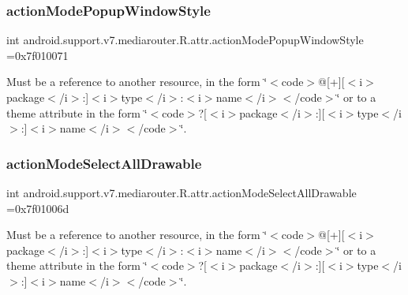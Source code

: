 \subsubsection{\texorpdfstring{action\+Mode\+Popup\+Window\+Style}{actionModePopupWindowStyle}}
{\footnotesize\ttfamily int android.\+support.\+v7.\+mediarouter.\+R.\+attr.\+action\+Mode\+Popup\+Window\+Style =0x7f010071\hspace{0.3cm}{\ttfamily [static]}}

Must be a reference to another resource, in the form \char`\"{}$<$code$>$@\mbox{[}+\mbox{]}\mbox{[}$<$i$>$package$<$/i$>$\+:\mbox{]}$<$i$>$type$<$/i$>$\+:$<$i$>$name$<$/i$>$$<$/code$>$\char`\"{} or to a theme attribute in the form \char`\"{}$<$code$>$?\mbox{[}$<$i$>$package$<$/i$>$\+:\mbox{]}\mbox{[}$<$i$>$type$<$/i$>$\+:\mbox{]}$<$i$>$name$<$/i$>$$<$/code$>$\char`\"{}. \mbox{\label{classandroid_1_1support_1_1v7_1_1mediarouter_1_1R_1_1attr_a06a8af9b5fdcb81fe91facc4e5cf9781}} 
\subsubsection{\texorpdfstring{action\+Mode\+Select\+All\+Drawable}{actionModeSelectAllDrawable}}
{\footnotesize\ttfamily int android.\+support.\+v7.\+mediarouter.\+R.\+attr.\+action\+Mode\+Select\+All\+Drawable =0x7f01006d\hspace{0.3cm}{\ttfamily [static]}}

Must be a reference to another resource, in the form \char`\"{}$<$code$>$@\mbox{[}+\mbox{]}\mbox{[}$<$i$>$package$<$/i$>$\+:\mbox{]}$<$i$>$type$<$/i$>$\+:$<$i$>$name$<$/i$>$$<$/code$>$\char`\"{} or to a theme attribute in the form \char`\"{}$<$code$>$?\mbox{[}$<$i$>$package$<$/i$>$\+:\mbox{]}\mbox{[}$<$i$>$type$<$/i$>$\+:\mbox{]}$<$i$>$name$<$/i$>$$<$/code$>$\char`\"{}. \mbox{\label{classandroid_1_1support_1_1v7_1_1mediarouter_1_1R_1_1attr_a9ee38f4e5bf0894aeb5da86ae98afb1a}} 
